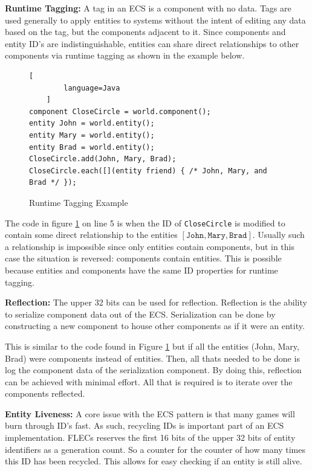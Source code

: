\textbf{Runtime Tagging:}
A tag in an ECS is a component with no data. Tags are used generally to apply entities to systems without the intent of editing any data based on the tag, but the components adjacent to it. Since components and entity ID's are indistinguishable, entities can share direct relationships to other components via runtime tagging as shown in the example below. \cite{RomeoPHD}

\begin{figure}[H]
    \begin{lstlisting}[
        language=Java
    ]
component CloseCircle = world.component();
entity John = world.entity();
entity Mary = world.entity();
entity Brad = world.entity();
CloseCircle.add(John, Mary, Brad);
CloseCircle.each([](entity friend) { /* John, Mary, and Brad */ });
\end{lstlisting}
    \caption{Runtime Tagging Example}
    \label{code:runtime_tagging}
\end{figure}

The code in figure \ref{code:runtime_tagging} on line 5 is when the ID of \texttt{CloseCircle} is modified to contain some direct relationship to the entities $[\texttt{John}, \texttt{Mary}, \texttt{Brad}]$. Usually such a relationship is impossible since only entities contain components, but in this case the situation is reversed: components contain entities. This is possible because entities and components have the same ID properties for runtime tagging.

\textbf{Reflection:}
The upper 32 bits can be used for reflection. Reflection is the ability to serialize component data out of the ECS. Serialization can be done by constructing a new component to house other components as if it were an entity.

This is similar to the code found in Figure \ref{code:runtime_tagging} but if all the entities (John, Mary, Brad) were components instead of entities. Then, all thats needed to be done is log the component data of the serialization component. By doing this, reflection can be achieved with minimal effort. All that is required is to iterate over the components reflected.

\textbf{Entity Liveness:}
A core issue with the ECS pattern is that many games will burn through ID's fast. As such, recycling IDs is important part of an ECS implementation. FLECs reserves the first 16 bits of the upper 32 bits of entity identifiers as a generation count. So a counter for the counter of how many times this ID has been recycled. This allows for easy checking if an entity is still alive.  

